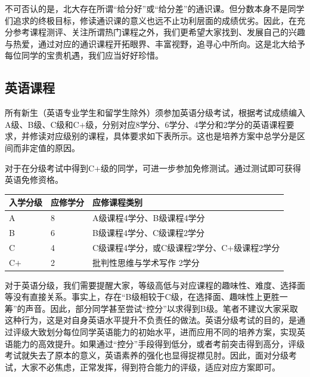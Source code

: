 \documentclass[11pt,oneside]{book}
\begin{document}
\vspace{10pt}

不可否认的是，北大存在所谓“给分好”或“给分差”的通识课。但分数本身不是同学们追求的终极目标，修读通识课的意义也远不止功利层面的成绩优劣。因此，在充分参考课程测评、关注所谓热门课程之外，我们更希望大家找到、发展自己的兴趣与热爱，通过对应的通识课程开拓眼界、丰富视野，追寻心中所向。这是北大给予每位同学的宝贵机遇，我们应当好好珍惜。

\subsection{英语课程}
所有新生（英语专业学生和留学生除外）须参加英语分级考试，根据考试成绩编入A级、B级、C级和C+级，分别对应8学分、6学分、4学分和2学分的英语课程要求，并修读对应级别的课程，具体要求如下表所示。这也是培养方案中总学分是区间而非定值的原因。

\vspace{10pt}

对于在分级考试中得到C+级的同学，可进一步参加免修测试。通过测试即可获得英语免修资格。

\begin{table}[htbp]
	\centering
	
	\begin{tabular}{| l | l | l |}
		\hline
		入学分级 & 应修学分 & 应修课程类别 \\
		\hline
		A & 8 & A级课程4学分、B级课程4学分 \\
		\hline
		B & 6 & B级课程4学分、C级课程2学分 \\
		\hline
		C & 4 & C级课程4学分，或C级课程2学分、C+级课程2学分 \\
		\hline
		C$+$  & 2 & 批判性思维与学术写作\hspace{6pt} 2学分 \\
		\hline
		
	\end{tabular}
	
\end{table}

对于英语分级，我们需要提醒大家，等级高低与对应课程的趣味性、难度、选择面等没有直接关系。事实上，存在“B级相较于C级，在选择面、趣味性上更胜一筹”的声音。因此，部分同学甚至尝试“控分”以求得到B级。笔者不建议大家采取这种行为，这是对自身英语水平提升不负责任的做法。英语分级考试的目的，是通过评级大致划分每位同学英语能力的初始水平，进而应用不同的培养方案，实现英语能力的高效提升。如果通过“控分”手段得到低分，或者考前突击得到高分，评级考试就失去了原本的意义，英语素养的强化也显得捉襟见肘。因此，面对分级考试，大家不必焦虑，正常发挥，得到符合能力的评级，适应对应方案即可。
\end{document}
